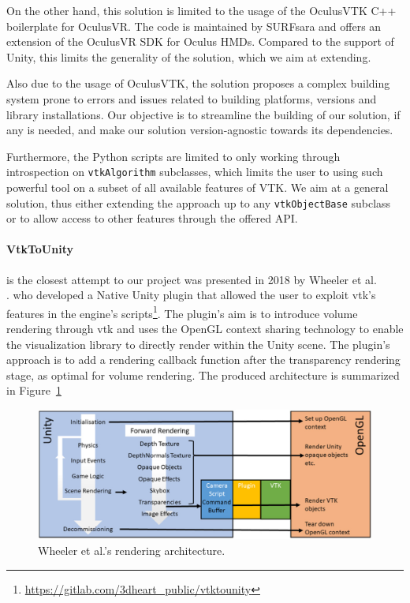 On the other hand, this solution is limited to the usage of the OculusVTK C++ boilerplate for OculusVR. The code is maintained by SURFsara and offers an extension of the OculusVR SDK for Oculus HMDs. Compared to the support of Unity, this limits the generality of the solution, which we aim at extending.

Also due to the usage of OculusVTK, the solution proposes a complex building system prone to errors and issues related to building platforms, versions and library installations. Our objective is to streamline the building of our solution, if any is needed, and make our solution version-agnostic towards its dependencies. 

Furthermore, the Python scripts are limited to only working through introspection on \verb|vtkAlgorithm| subclasses, which limits the user to using such powerful tool on a subset of all available features of VTK. We aim at a general solution, thus either extending the approach up to any \verb|vtkObjectBase| subclass or to allow access to other features through the offered API.

\paragraph{VtkToUnity} is the closest attempt to our project was presented in 2018 by Wheeler et al. \\
\cite{wheeler_virtual_2018}. who developed a Native Unity plugin that allowed the user to exploit \acrshort{vtk}'s features in the engine's scripts\footnote{\url{https://gitlab.com/3dheart_public/vtktounity}}. The plugin's aim is to introduce volume rendering through \acrshort{vtk} and uses the OpenGL context sharing technology to enable the visualization library to directly render within the Unity scene. The plugin's approach is to add a rendering callback function after the transparency rendering stage, as optimal for volume rendering. The produced architecture is summarized in Figure~\ref{fig:wheeler-architecture} 

\begin{figure}[t]
    \centering
    \includegraphics[width=\textwidth]{pictures/wheeler_arch.PNG}
    \caption{Wheeler et al.'s rendering architecture.}
    \label{fig:wheeler-architecture}
\end{figure}

